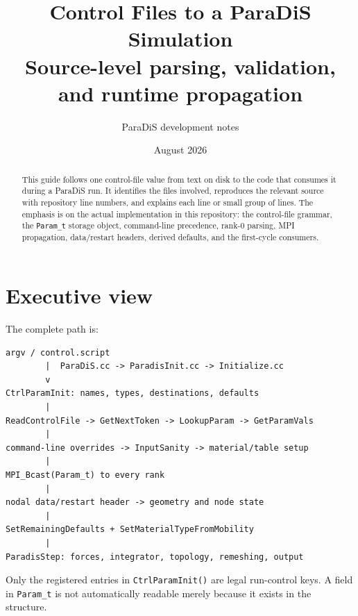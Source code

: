 \documentclass[11pt]{article}
\title{Control Files to a ParaDiS Simulation\\\large Source-level parsing, validation, and runtime propagation}
\author{ParaDiS development notes}
\date{August 2026}
\newcommand{\code}[1]{\texorpdfstring{\nolinkurl{#1}}{#1}}
\begin{document}
\maketitle
\begin{abstract}
This guide follows one control-file value from text on disk to the code that consumes it during a ParaDiS run. It identifies the files involved, reproduces the relevant source with repository line numbers, and explains each line or small group of lines. The emphasis is on the actual implementation in this repository: the control-file grammar, the \code{Param_t} storage object, command-line precedence, rank-0 parsing, MPI propagation, data/restart headers, derived defaults, and the first-cycle consumers.
\end{abstract}
\tableofcontents
\newpage

\section{Executive view}
The complete path is:
\begin{verbatim}
argv / control.script
        |  ParaDiS.cc -> ParadisInit.cc -> Initialize.cc
        v
CtrlParamInit: names, types, destinations, defaults
        |
ReadControlFile -> GetNextToken -> LookupParam -> GetParamVals
        |
command-line overrides -> InputSanity -> material/table setup
        |
MPI_Bcast(Param_t) to every rank
        |
nodal data/restart header -> geometry and node state
        |
SetRemainingDefaults + SetMaterialTypeFromMobility
        |
ParadisStep: forces, integrator, topology, remeshing, output
\end{verbatim}
Only the registered entries in \code{CtrlParamInit()} are legal run-control keys. A field in \code{Param_t} is not automatically readable merely because it exists in the structure.
\end{document}
